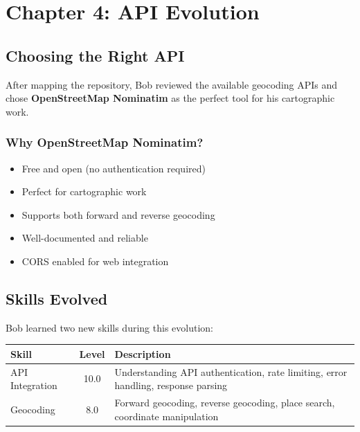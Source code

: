 \documentclass[11pt,letterpaper]{article}
\begin{document}
\section{Chapter 4: API Evolution}

\subsection{Choosing the Right API}

After mapping the repository, Bob reviewed the available geocoding APIs and chose \textbf{OpenStreetMap Nominatim} as the perfect tool for his cartographic work.

\begin{highlightbox}
\subsubsection*{Why OpenStreetMap Nominatim?}
\begin{itemize}[leftmargin=*]
    \item \checkmark Free and open (no authentication required)
    \item \checkmark Perfect for cartographic work
    \item \checkmark Supports both forward and reverse geocoding
    \item \checkmark Well-documented and reliable
    \item \checkmark CORS enabled for web integration
\end{itemize}
\end{highlightbox}

\subsection{Skills Evolved}

Bob learned two new skills during this evolution:

\begin{table}[h]
\centering
\begin{tabular}{lcl}
\toprule
\textbf{Skill} & \textbf{Level} & \textbf{Description} \\
\midrule
API Integration & 10.0 & Understanding API authentication, rate limiting, error handling, response parsing \\
Geocoding & 8.0 & Forward geocoding, reverse geocoding, place search, coordinate manipulation \\
\bottomrule
\end{tabular}
\end{table}
\end{document}
